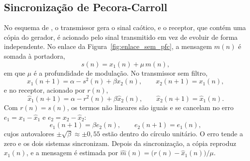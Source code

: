 \documentclass{pfccefsa}
\begin{document}
\subsection{Sincronização de Pecora-Carroll}

No esquema de \textcite{Pecora1990}, o transmissor gera o sinal caótico, e o
receptor, que contém uma cópia do gerador, é acionado pelo sinal transmitido em
vez de evoluir de forma independente. No enlace da
Figura~\ref{fig:enlace_sem_pfc}, a mensagem $m(n)$ é somada à portadora,
\begin{equation}
  s(n)=x_1(n)+\mu\,m(n),
  \label{eq:tx_sem_pfc}
\end{equation}
em que $\mu$ é a profundidade de modulação. No transmissor sem filtro,
\begin{equation}
  x_1(n+1)=\alpha-s^2(n)+\beta x_2(n),\qquad x_2(n+1)=x_1(n),
  \label{eq:tx_estado_sem_pfc}
\end{equation}
e no receptor, acionado por $r(n)$,
\begin{equation}
  \hat x_1(n+1)=\alpha-r^2(n)+\beta\hat x_2(n),\qquad
  \hat x_2(n+1)=\hat x_1(n).
  \label{eq:rx_estado_sem_pfc}
\end{equation}
Com $r(n)=s(n)$, os termos não lineares são iguais e se cancelam no erro
$e_1=x_1-\hat x_1$ e $e_2=x_2-\hat x_2$:
\begin{equation}
  e_1(n+1)=\beta e_2(n),\qquad e_2(n+1)=e_1(n),
  \label{eq:erro_sem_pfc}
\end{equation}
cujos autovalores $\pm\sqrt{\beta}\approx\pm0{,}55$ estão dentro do círculo
unitário. O erro tende a zero e os dois sistemas sincronizam. Depois da
sincronização, a cópia reproduz $x_1(n)$, e a mensagem é estimada por
$\hat m(n)=\bigl(r(n)-\hat x_1(n)\bigr)/\mu$.
\end{document}
